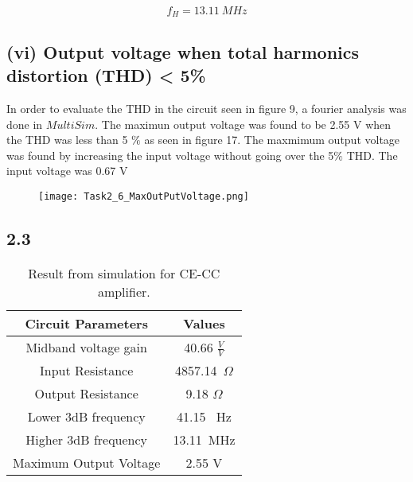 	$$f_{H} = 13.11 \ M Hz $$
\pagebreak
  \subsection*{(vi) Output voltage when total harmonics distortion (THD) < 5\%}

  In order to evaluate the THD in the circuit seen in figure 9, a fourier analysis was done in $MultiSim$. The maximun output voltage was found to be 2.55 V when the THD was less than 5 $\%$ as seen in figure 17. The maxmimum output voltage was found by increasing the input voltage without going over the 5$\%$ THD. The input voltage was 0.67 V	


	\begin{figure}[h!]
        \centering
        \texttt{[image: Task2\_6\_MaxOutPutVoltage.png]}
	\end{figure}
    
\pagebreak
  
\subsection*{2.3}
  
	\begin{table}[htbp]
     \centering
       \begin{tabular}{c|c}
        \hline
         Circuit Parameters & Values \\
       \hline
        Midband voltage gain          & 40.66 $\frac{V}{V}$ \\
        Input Resistance & 4857.14\ $\Omega$ \\
        Output Resistance & 9.18 $\Omega$\\
        Lower 3dB frequency & 41.15 \ Hz\\
        Higher 3dB frequency & 13.11\ MHz\\
        Maximum Output Voltage & 2.55 V\\
       \end{tabular}%
     \caption{Result from simulation for CE-CC amplifier.}
     \label{tab:addlabel}%
	\end{table}%


